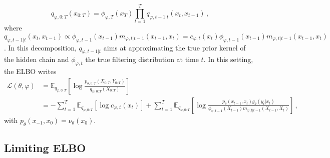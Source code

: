 \documentclass{article}
\newcommand{\1}{\mathbbm{1}}
\begin{document}
\begin{itemize}
$$
q_{\varphi,0:T}(x_{0:T}) = \phi_{\varphi,T}(x_T)\prod_{t=1}^Tq_{\varphi,t-1|t}(x_t,x_{t-1})\,,
$$
where $q_{\varphi,t-1|t}(x_t,x_{t-1}) \propto \phi_{\varphi,t-1}(x_{t-1})m_{\varphi,t|t-1}(x_{t-1},x_t) = c_{\varphi,t}(x_t)\phi_{\varphi,t-1}(x_{t-1})m_{\varphi,t|t-1}(x_{t-1},x_t)$. In this decomposition, $q_{\varphi,t-1|t}$ aims at approximating the true prior kernel of the hidden chain and $\phi_{\varphi,t}$ the true filtering distribution at time $t$. In this setting, the ELBO writes
\begin{align*}
\mathcal{L}(\theta,\varphi) &= \mathbb{E}_{q_{\varphi,0:T}}\left[\log \frac{p_{\theta,0:T}(X_{0:T},Y_{0:T})}{q_{\varphi,0:T}(X_{0:T})}\right]\\
&= -\sum_{t=1}^T\mathbb{E}_{q_{\varphi,0:T}}\left[\log c_{\varphi,t}(x_t)\right] + \sum_{t=1}^T\mathbb{E}_{q_{\varphi,0:T}}\left[\log \frac{p_\theta(x_{t-1},x_t)g_\theta(y_t|x_t)}{ \phi_{\varphi,t-1}(X_{t-1})m_{\varphi,t|t-1}(X_{t-1},X_t) }\right]\,,
\end{align*}
with $p_\theta(x_{-1},x_0) = \nu_\theta(x_0)$.
\end{itemize}

\subsection*{Limiting ELBO}
\end{document}
